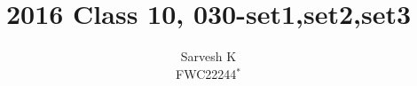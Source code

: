 \documentclass[book,11pt]{IEEEtran}
\DeclareMathOperator*{\Res}{Res}
\begin{document}
\newtheorem{theorem}{Theorem}[section]
\newtheorem{problem}{Problem}
\newtheorem{proposition}{Proposition}[section]
\newtheorem{lemma}{Lemma}[section]
\newtheorem{corollary}[theorem]{Corollary}
\newtheorem{example}{Example}[section]
\newtheorem{definition}[problem]{Definition}
\newcommand{\BEQA}{\begin{eqnarray}}
\newcommand{\EEQA}{\end{eqnarray}}
\newcommand{\define}{\stackrel{\triangle}{=}}

\providecommand{\mbf}{\mathbf}
\providecommand{\pr}[1]{\ensuremath{\Pr\left(#1\right)}}
\providecommand{\qfunc}[1]{\ensuremath{Q\left(#1\right)}}
\providecommand{\sbrak}[1]{\ensuremath{{}\left[#1\right]}}
\providecommand{\lsbrak}[1]{\ensuremath{{}\left[#1\right.}}
\providecommand{\rsbrak}[1]{\ensuremath{{}\left.#1\right]}}
\providecommand{\brak}[1]{\ensuremath{\left(#1\right)}}
\providecommand{\lbrak}[1]{\ensuremath{\left(#1\right.}}
\providecommand{\rbrak}[1]{\ensuremath{\left.#1\right)}}
\providecommand{\cbrak}[1]{\ensuremath{\left\{#1\right\}}}
\providecommand{\lcbrak}[1]{\ensuremath{\left\{#1\right.}}
\providecommand{\rcbrak}[1]{\ensuremath{\left.#1\right\}}}
\theoremstyle{remark}
\newtheorem{rem}{Remark}
\newcommand{\sgn}{\mathop{\mathrm{sgn}}}
\providecommand{\abs}[1]{\left\vert#1\right\vert}
\providecommand{\res}[1]{\Res\displaylimits_{#1}} 
\providecommand{\norm}[1]{\left\lVert#1\right\rVert}
\providecommand{\mtx}[1]{\mathbf{#1}}
\providecommand{\mean}[1]{E\left[ #1 \right]}
\providecommand{\fourier}{\overset{\mathcal{F}}{ \rightleftharpoons}}
\providecommand{\system}[1]{\overset{\mathcal{#1}}{ \longleftrightarrow}}
\newcommand{\solution}{\noindent \textbf{Solution: }}
\newcommand{\cosec}{\,\text{cosec}\,}
\providecommand{\dec}[2]{\ensuremath{\overset{#1}{\underset{#2}{\gtrless}}}}
\newcommand{\myvec}[1]{\ensuremath{\begin{pmatrix}#1\end{pmatrix}}}
\newcommand{\mydet}[1]{\ensuremath{\begin{vmatrix}#1\end{vmatrix}}}
\let\vec\mathbf
\def\putbox#1#2#3{\makebox[0in][l]{\makebox[#1][l]{}\raisebox{\baselineskip}[0in][0in]{\raisebox{#2}[0in][0in]{#3}}}}
     \def\rightbox#1{\makebox[0in][r]{#1}}
     \def\centbox#1{\makebox[0in]{#1}}
     \def\topbox#1{\raisebox{-\baselineskip}[0in][0in]{#1}}
     \def\midbox#1{\raisebox{-0.5\baselineskip}[0in][0in]{#1}}

\vspace{3cm}
\title{
2016 Class 10, 030-set1,set2,set3
}
\author{ Sarvesh K\\FWC22244$^{*}$%
	
}	
\end{document}
